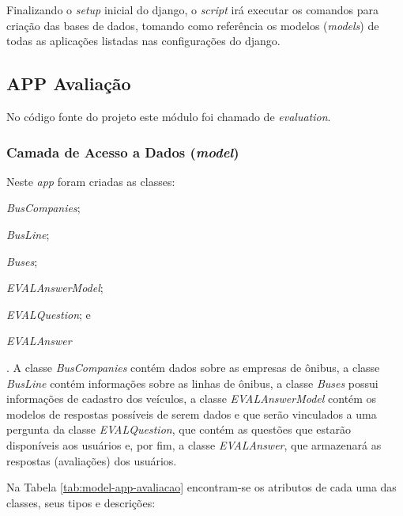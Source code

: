 Finalizando o \textit{setup} inicial do \gls{django}, o \textit{script} irá executar os comandos para criação das bases de dados, tomando como referência os modelos (\textit{models}) de todas as aplicações listadas nas configurações do \gls{django}.

\subsection{APP Avaliação}
No código fonte do projeto este módulo foi chamado de \textit{evaluation}.

\subsubsection{Camada de Acesso a Dados (\textit{model})}\label{subsubsec:eval-camada-model}
Neste \textit{app} foram criadas as classes:
\begin{enumerate*}[label=\itshape\alph*\upshape)]
    \item \textit{BusCompanies};
    \item \textit{BusLine};
    \item \textit{Buses};
    \item \textit{EVALAnswerModel};
    \item \textit{EVALQuestion}; e
    \item \textit{EVALAnswer}
\end{enumerate*}.
A classe \textit{BusCompanies} contém dados sobre as empresas de ônibus, a classe \textit{BusLine} contém informações sobre as linhas de ônibus, a classe \textit{Buses} possui informações de cadastro dos veículos, a classe \textit{EVALAnswerModel} contém os modelos de respostas possíveis de serem dados e que serão vinculados a uma pergunta da classe \textit{EVALQuestion}, que contém as questões que estarão disponíveis aos usuários e, por fim, a classe \textit{EVALAnswer}, que armazenará as respostas (avaliações) dos usuários.

Na Tabela \ref{tab:model-app-avaliacao} encontram-se os atributos de cada uma das classes, seus tipos e descrições:

